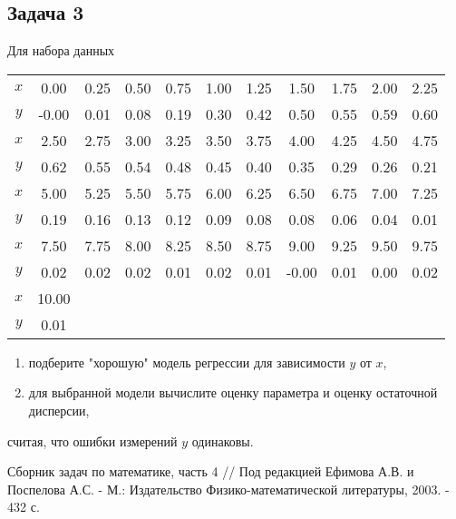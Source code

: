 \documentclass[a4paper,12pt]{article}
\begin{document}
\subsection*{Задача 3}

Для набора данных

\begin{center}
    \begin{tabular}{|c|c|c|c|c|c|c|c|c|c|c|}
        \hline
        $x$ & 0.00  & 0.25                  & 0.50 & 0.75 & 1.00 & 1.25 & 1.50  & 1.75 & 2.00 & 2.25 \\
        $y$ & -0.00 & 0.01                  & 0.08 & 0.19 & 0.30 & 0.42 & 0.50  & 0.55 & 0.59 & 0.60 \\
        \hline
        \hline
        $x$ & 2.50  & 2.75                  & 3.00 & 3.25 & 3.50 & 3.75 & 4.00  & 4.25 & 4.50 & 4.75 \\
        $y$ & 0.62  & 0.55                  & 0.54 & 0.48 & 0.45 & 0.40 & 0.35  & 0.29 & 0.26 & 0.21 \\
        \hline
        \hline
        $x$ & 5.00  & 5.25                  & 5.50 & 5.75 & 6.00 & 6.25 & 6.50  & 6.75 & 7.00 & 7.25 \\
        $y$ & 0.19  & 0.16                  & 0.13 & 0.12 & 0.09 & 0.08 & 0.08  & 0.06 & 0.04 & 0.01 \\
        \hline
        \hline
        $x$ & 7.50  & 7.75                  & 8.00 & 8.25 & 8.50 & 8.75 & 9.00  & 9.25 & 9.50 & 9.75 \\
        $y$ & 0.02  & 0.02                  & 0.02 & 0.01 & 0.02 & 0.01 & -0.00 & 0.01 & 0.00 & 0.02 \\
        \hline
        \hline
        $x$ & 10.00 & \multicolumn{9}{l|}{}                                                          \\
        $y$ & 0.01  & \multicolumn{9}{l|}{}                                                          \\
        \hline
    \end{tabular}
\end{center}

\begin{enumerate}
    \item подберите "хорошую"{} модель регрессии для зависимости $y$ от $x$,
    \item для выбранной модели вычислите оценку параметра и оценку остаточной дисперсии,
\end{enumerate}
считая, что ошибки измерений $y$ одинаковы.


\begin{thebibliography}{1}
     Сборник задач по математике, часть 4 // Под редакцией Ефимова А.В. и Поспелова А.С. - М.: Издательство Физико-математической
    литературы, 2003. - 432 с.
\end{thebibliography}
\end{document}
